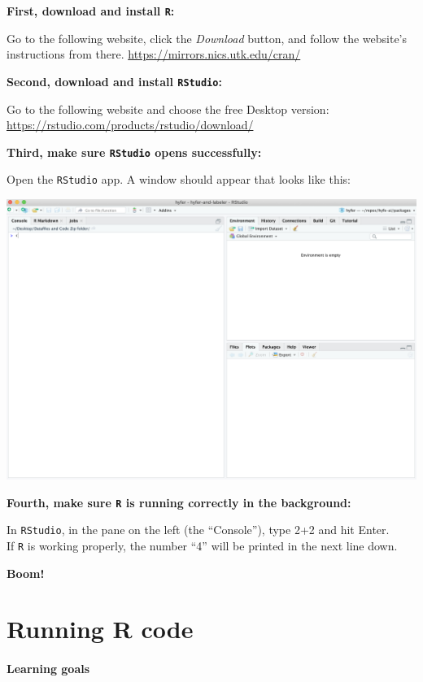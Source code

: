 \documentclass[
]{book}
\begin{document}
\textbf{First, download and install \texttt{R}: }

Go to the following website, click the \emph{Download} button, and follow the website's instructions from there.
\url{https://mirrors.nics.utk.edu/cran/}

\textbf{Second, download and install \texttt{RStudio}:}

Go to the following website and choose the free Desktop version:
\url{https://rstudio.com/products/rstudio/download/}

\textbf{Third, make sure \texttt{RStudio} opens successfully:}

Open the \texttt{RStudio} app. A window should appear that looks like this:

\includegraphics{img/rstudio_firstopen.png}

\textbf{Fourth, make sure \texttt{R} is running correctly in the background:}

In \texttt{RStudio}, in the pane on the left (the ``Console''), type 2+2 and hit Enter.\\
If \texttt{R} is working properly, the number ``4'' will be printed in the next line down.

\textbf{Boom!}

\hypertarget{running-r-code}{%
\chapter{Running R code}\label{running-r-code}}

\hypertarget{learning-goals}{%
\subsubsection*{Learning goals}\label{learning-goals}}
\end{document}
